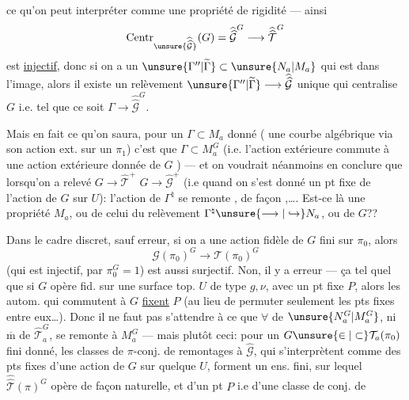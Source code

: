 
ce qu'on peut  interpréter comme une propriété de rigidité --- ainsi
\[
\operatorname{Centr}_{\unsure{\widehat{\widehat{\mathcal G}}}}(G)
=\widehat{\widehat{\mathcal G}}^{G}
\longrightarrow\widehat{\widehat{\mathcal T}}^{G}
\]
est \uline{injectif}, donc si on a un $\unsure{\Gamma''|\widetilde{\Gamma}}\subset\unsure{N_a|M_a}$ qui est dans l'image, alors il existe un relèvement $\unsure{\Gamma''|\widetilde{\Gamma}}\longrightarrow\widehat{\widehat{\mathcal G}}$ unique qui centralise $G$ i.e. tel que ce soit $\Gamma\longrightarrow\widehat{\widehat{\mathcal G}}^{G}$.

Mais en fait ce qu'on saura, pour un $\Gamma\subset M_a$ donné ( une courbe algébrique via son action ext. sur un $\pi_1$) c'est que $\Gamma\subset M_a^G$ (i.e. l'action extérieure commute à une action extérieure donnée de $G$ ) --- et on voudrait néanmoins en conclure que lorsqu'on a relevé $G\longrightarrow\widehat{\mathcal T}^{+}$  $G\longrightarrow\widehat{\mathcal G}^{+}$ (i.e quand on s'est donné un pt fixe de l'action de $G$ sur $U$):  l'action de $\Gamma^{\natural}$ se remonte  ,  de façon  ,\ldots . Est-ce là une propriété  $M_a$, ou de celui du relèvement $\Gamma^{\natural}\unsure{\longrightarrow|\hookrightarrow}N_a$, ou de $G$??


Dans le cadre discret, sauf erreur, si on a une action fidèle  de $G$ fini sur $\pi_0$, alors 
\[
\mathcal G(\pi_0)^G\longrightarrow\mathcal T(\pi_0)^G
\]
(qui est injectif, par $\pi_0^G=1$) est aussi surjectif. Non, il y a erreur --- ça  tel quel que si $G$ opère fid. sur une surface top. $U$ de type $g,\nu$, avec un pt fixe $P$, alors les autom. qui commutent à $G$ \uline{fixent} $P$ (au lieu de permuter seulement les pts fixes entre eux\ldots). Donc il ne faut pas s'attendre à ce que $\forall$  de $\unsure{N_a^G|M_a^G}$, ni $\overline{\mathrm m}$ de $\widehat{\mathcal T}_a^G$, se remonte à $M_a^G$ --- mais plutôt ceci: pour un $G\unsure{\in|\subset}\mathcal T_a(\pi_0)$  fini donné, les classes de $\pi$-conj. de remontages à $\widehat{\mathcal G}$,  qui s'interprètent comme des pts fixes d'une action de $G$ sur quelque $U$, forment un ens. fini, sur lequel $\widehat{\widehat{\mathcal T}}(\pi)^G$ opère de façon naturelle, et   d'un pt $P$ i.e d'une classe de conj. de 
